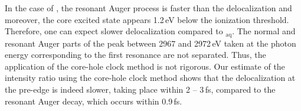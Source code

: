 In the case of \ki, the resonant Auger process is faster than the delocalization and moreover, the core excited state appears 1.2\,eV below the ionization threshold. Therefore, one can expect slower delocalization compared to \cli$_{\text{aq}}$. The normal and resonant Auger parts of the peak between 2967 and 2972\,eV taken at the photon energy corresponding to the first resonance are not separated. Thus, the application of the core-hole clock method is not rigorous. Our estimate of the intensity ratio using the core-hole clock method shows that the delocalization at the pre-edge is indeed slower, taking place within 2 -- 3\,fs, compared to the resonant Auger decay, which occurs within 0.9\,fs.


%
%
%
%
%
%
%
